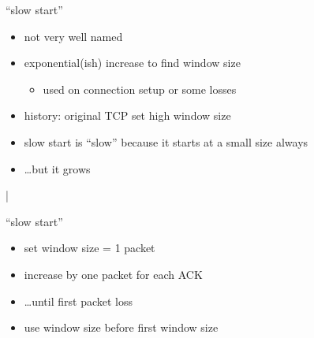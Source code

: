 \begin{frame}{``slow start''}
    \begin{itemize}
    \item not very well named
    \vspace{.5cm}
    \item exponential(ish) increase to find window size 
        \begin{itemize}
        \item used on connection setup or some losses
        \end{itemize}
    \vspace{.5cm}
    \item history: original TCP set high window size
    \item slow start is ``slow'' because it starts at a small size always
    \item \ldots but it grows 
    \end{itemize}
\end{frame}|

\begin{frame}{``slow start''}
    \begin{itemize}
    \item set window size = 1 packet
    \item increase by one packet for each ACK
    \item \ldots until first packet loss
    \item use window size before first window size
    \end{itemize}
\end{frame}

